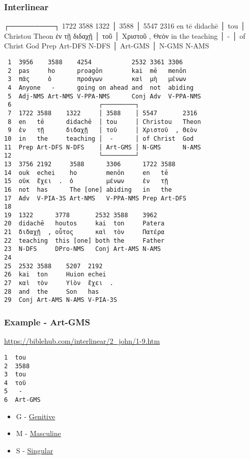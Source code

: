 \documentclass[11pt]{article}
\begin{document}
\subsubsection{Interlinear}
\label{sec:org25cdd4f}

                      ┌─────────┐
1722 3588    1322     │ 3588    │ 5547       2316
en   tē      didachē  │ tou     │ Christou   Theon
ἐν   τῇ      διδαχῇ   │ τοῦ     │ Χριστοῦ  , Θεὸν
in   the     teaching │  -      │ of Christ  God
Prep Art-DFS N-DFS    │ Art-GMS │ N-GMS      N-AMS

\makeatletter
\renewcommand\verbatim@font{\normalfont\fontencoding{T1}\ttfamily}
\makeatother

\begin{verbatim}
 1  3956    3588    4254           2532 3361 3306
 2  pas     ho      proagōn        kai  mē   menōn
 3  πᾶς     ὁ       προάγων        καὶ  μὴ   μένων
 4  Anyone   -      going on ahead and  not  abiding
 5  Adj-NMS Art-NMS V-PPA-NMS      Conj Adv  V-PPA-NMS
 6                        ┌─────────┐
 7  1722 3588    1322     │ 3588    │ 5547       2316
 8  en   tē      didachē  │ tou     │ Christou   Theon
 9  ἐν   τῇ      διδαχῇ   │ τοῦ     │ Χριστοῦ  , Θεὸν
10  in   the     teaching │  -      │ of Christ  God
11  Prep Art-DFS N-DFS    │ Art-GMS │ N-GMS      N-AMS
12                        └─────────┘
13  3756 2192     3588      3306      1722 3588
14  ouk  echei    ho        menōn     en   tē
15  οὐκ  ἔχει  .  ὁ         μένων     ἐν   τῇ
16  not  has      The [one] abiding   in   the
17  Adv  V-PIA-3S Art-NMS   V-PPA-NMS Prep Art-DFS
18  
19  1322      3778       2532 3588    3962
20  didachē   houtos     kai  ton     Patera
21  διδαχῇ  , οὗτος      καὶ  τὸν     Πατέρα
22  teaching  this [one] both the     Father
23  N-DFS     DPro-NMS   Conj Art-AMS N-AMS
24  
25  2532 3588    5207  2192
26  kai  ton     Huion echei
27  καὶ  τὸν     Υἱὸν  ἔχει  .
28  and  the     Son   has
29  Conj Art-AMS N-AMS V-PIA-3S
\end{verbatim}

\subsubsection{Example - Art-GMS}
\label{sec:orgeca3f45}
\url{https://biblehub.com/interlinear/2\_john/1-9.htm}

\begin{verbatim}
1  tou
2  3588
3  tou
4  τοῦ
5   -
6  Art-GMS
\end{verbatim}

\begin{itemize}
\item G - \href{https://en.wikipedia.org/wiki/Grammatical\_case}{Genitive}
\item M - \href{https://en.wikipedia.org/wiki/Grammatical\_case}{Masculine}
\item S - \href{https://en.wikipedia.org/wiki/Grammatical\_case}{Singular}
\end{itemize}
\end{document}
